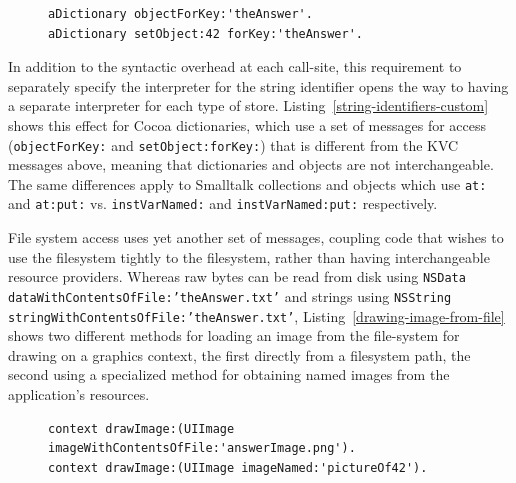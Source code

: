 \documentclass{acm_proc_article-sp}
\begin{document}
\begin{figure}[htbp]
\begin{lstlisting}[style=numbers,label=string-identifiers-custom,caption=Retrieve and store value with custom stores.]
aDictionary objectForKey:'theAnswer'.
aDictionary setObject:42 forKey:'theAnswer'.
\end{lstlisting}
\end{figure}



In addition to the syntactic overhead at each call-site, this requirement to separately specify the interpreter
for the string identifier opens the way to having a separate interpreter for each type of store. 
Listing~\ref{string-identifiers-custom} shows this effect for Cocoa dictionaries, which use a set of messages for
access ({\tt objectForKey:} and {\tt setObject:forKey:}) that is different from the KVC messages above, meaning
 that dictionaries and objects are not interchangeable.  
The same differences apply to Smalltalk collections and objects which use {\tt at:} and {\tt at:put:} vs. {\tt instVarNamed:} and {\tt instVarNamed:put:}
respectively.

\sloppy		%

File system access uses yet another set of messages, coupling code that wishes to use the filesystem tightly to the filesystem,
rather than having interchangeable resource providers.  Whereas raw bytes can be read from disk using
{\tt NSData dataWithContentsOfFile:'theAnswer.txt'} and strings using 
{\tt NSString stringWithContentsOfFile:'theAnswer.txt'},  Listing~\ref{drawing-image-from-file} shows two different methods
for loading an image from the file-system for drawing on a graphics context, the first directly from a filesystem path,
the second using a specialized method for obtaining named images from the application's resources.

\fussy


\begin{figure}[htbp]
\begin{lstlisting}[style=numbers,label=drawing-image-from-file,caption=Drawing an image stored in a file.]
context drawImage:(UIImage imageWithContentsOfFile:'answerImage.png').
context drawImage:(UIImage imageNamed:'pictureOf42').
\end{lstlisting}
\end{figure}
\end{document}
